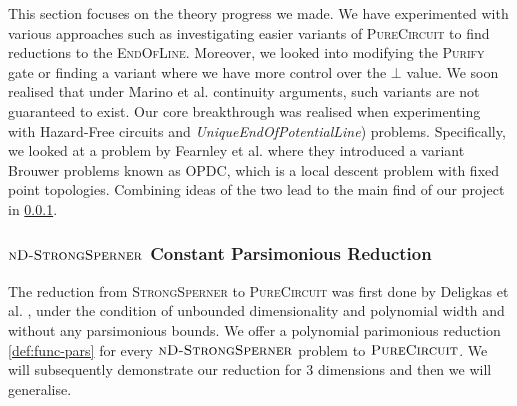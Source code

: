 This section focuses on the theory progress we made.
We have experimented with various approaches
such as investigating easier variants of \textsc{PureCircuit} to find reductions
to the \textsc{EndOfLine}. Moreover, we looked into modifying the \textsc{Purify} gate
or finding a variant where we have more control over the $\bot$ value. We soon
realised that under Marino et al. \cite{marino_GeneralTheoryMetastable_1981} continuity
arguments, such variants are not guaranteed to exist.
Our core breakthrough was realised when experimenting with
Hazard-Free circuits  and \textit{UniqueEndOfPotentialLine}) problems. Specifically,
we looked at a problem by Fearnley et al. \cite{fearnley_UniqueEndPotential_2020} where
they introduced a variant Brouwer problems known as \textsc{OPDC}, which is a 
local descent problem with fixed point topologies. Combining ideas of the two 
lead to the main find of our project in \ref{sect:main-result}.






\subsubsection{$\textnormal{\textsc{nD-StrongSperner}}$ Constant Parsimonious Reduction} \label{sect:main-result}

The reduction from \textsc{StrongSperner} to \textsc{PureCircuit} was first
done by Deligkas et al. \cite{deligkas_PureCircuitTightInapproximability_2024},
under the condition of unbounded dimensionality and polynomial width and without any parsimonious bounds.
We offer a polynomial parimonious reduction \ref{def:func-pars}
for every $\textnormal{\textsc{nD-StrongSperner}}$ problem to  $\textnormal{\textsc{PureCircuit}}$.
We will subsequently demonstrate our reduction for 3 dimensions and then we will generalise.

